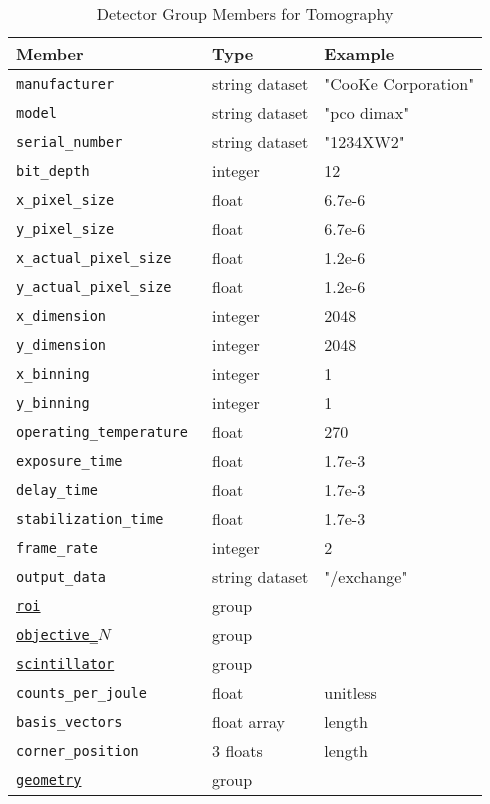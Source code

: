 \begin{table}[h!]\sffamily \footnotesize
\caption{Detector Group Members for Tomography}
\centering
{}
\begin{tabular}{l l l}
\toprule
\bfseries Member     & \bfseries Type & \bfseries Example \\
\midrule
\tt{manufacturer} & string dataset & "CooKe Corporation" \\   
\tt{model} & string dataset &  "pco dimax" \\
\tt{serial\_number} & string dataset &  "1234XW2" \\  
\tt{bit\_depth} & integer & 12 \\     
\tt{x\_pixel\_size} & float & 6.7e-6 \\
\tt{y\_pixel\_size} & float & 6.7e-6 \\
\tt{x\_actual\_pixel\_size} & float & 1.2e-6 \\
\tt{y\_actual\_pixel\_size} & float & 1.2e-6 \\
\tt{x\_dimension} & integer & 2048 \\
\tt{y\_dimension} & integer & 2048 \\
\tt{x\_binning} & integer & 1 \\
\tt{y\_binning} & integer & 1 \\
\tt{operating\_temperature} & float &  270 \\     
\tt{exposure\_time} & float & 1.7e-3 \\   
\tt{delay\_time} & float & 1.7e-3 \\   
\tt{stabilization\_time} & float & 1.7e-3 \\   
\tt{frame\_rate} & integer &  2 \\
\tt{output\_data} & string dataset & "/exchange" \\
\hyperref[table:roi]{\tt{roi}} & group & \\
\hyperref[table:objective]{\tt{objective\_$N$}} & group & \\
\hyperref[table:scintillator]{\tt{scintillator}} & group &\\
\tt{counts\_per\_joule} & float & unitless \\ 
\tt{basis\_vectors} & float array & length \\ 
\tt{corner\_position} & 3 floats & length \\
\hyperref[tomo:geometry]{\tt{geometry}} & group & \\
\bottomrule
\end{tabular}
\end{table}

